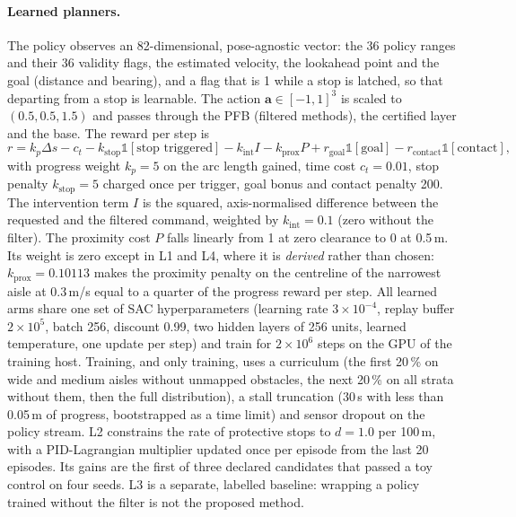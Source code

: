\documentclass[11pt]{article}
\theoremstyle{definition}
\begin{document}
\paragraph{Learned planners.} The policy observes an 82-dimensional, pose-agnostic vector: the 36 policy
ranges and their 36 validity flags, the estimated velocity, the lookahead point and the goal (distance and bearing), and a flag that is 1 while a stop is latched, so that departing from a stop is learnable. The
action $\mathbf{a}\in[-1,1]^3$ is scaled to $(0.5,0.5,1.5)$ and passes through the PFB (filtered methods),
the certified layer and the base. The reward per step is
\begin{equation}
r=k_p\Delta s-c_t-k_{\mathrm{stop}}\mathbb{1}[\text{stop triggered}]-k_{\mathrm{int}}I-k_{\mathrm{prox}}P
+r_{\mathrm{goal}}\mathbb{1}[\text{goal}]-r_{\mathrm{contact}}\mathbb{1}[\text{contact}],
\label{eq:reward}
\end{equation}
with progress weight $k_p=5$ on the arc length gained, time cost $c_t=0.01$, stop penalty
$k_{\mathrm{stop}}=5$ charged once per trigger, goal bonus and contact penalty 200. The intervention term
$I$ is the squared, axis-normalised difference between the requested and the filtered command, weighted
by $k_{\mathrm{int}}=0.1$ (zero without the filter). The proximity cost $P$ falls linearly from 1 at zero clearance to 0 at 0.5\,m. Its weight is zero except in L1 and L4, where it is \emph{derived} rather than
chosen: $k_{\mathrm{prox}}=0.10113$ makes the proximity penalty on the centreline of the narrowest aisle at
0.3\,m/s equal to a quarter of the progress reward per step. All learned arms share one set of SAC
hyperparameters \citep{haarnoja2018sac} (learning rate $3\times10^{-4}$, replay buffer $2\times10^5$,
batch 256, discount 0.99, two hidden layers of 256 units, learned temperature, one update per step) and
train for $2\times10^6$ steps on the GPU of the training host. Training, and only training, uses a
curriculum (the first 20\,\% on wide and medium aisles without unmapped obstacles, the next 20\,\% on all
strata without them, then the full distribution), a stall truncation (30\,s with less than 0.05\,m of
progress, bootstrapped as a time limit) and sensor dropout on the policy stream. L2 constrains the rate of
protective stops to $d=1.0$ per 100\,m, with a PID-Lagrangian multiplier \citep{stooke2020pid} updated
once per episode from the last 20 episodes. Its gains are the first of three declared candidates that passed a toy control on four seeds. L3 is a separate, labelled baseline: wrapping a policy trained without
the filter is not the proposed method.
\end{document}
